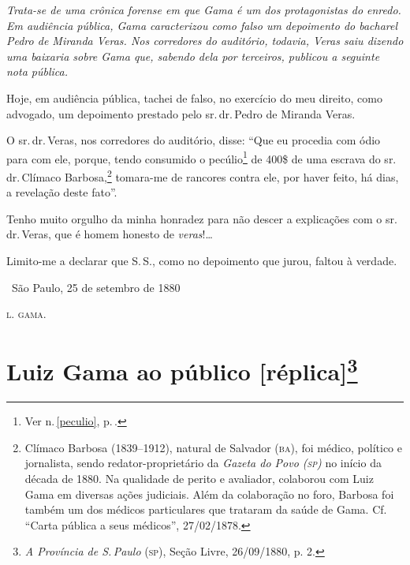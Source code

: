 
\begin{resumo}
\emph{Trata-se de uma crônica forense em que Gama é um dos protagonistas
do enredo. Em audiência pública, Gama caracterizou como falso um
depoimento do bacharel Pedro de Miranda Veras. Nos corredores do
auditório, todavia, Veras saiu dizendo uma baixaria sobre Gama que,
sabendo dela por terceiros, publicou a seguinte nota pública. }
\end{resumo}

Hoje, em audiência pública, tachei de falso, no exercício do meu
direito, como advogado, um depoimento prestado pelo sr.\,dr.\,Pedro de
Miranda Veras.

O sr.\,dr.\,Veras, nos corredores do auditório, disse: ``Que eu procedia
com ódio para com ele, porque, tendo consumido o pecúlio\footnote{
  Ver n.\,\ref{peculio}, p.\,\pageref{peculio}.} de 400\$ de uma escrava do sr.\,dr.\,Clímaco Barbosa,\footnote{Clímaco Barbosa (1839--1912), natural de \label{climaco}
  Salvador (\textsc{ba}), foi médico, político e jornalista, sendo
  redator-proprietário da \emph{Gazeta do Povo (\textsc{sp})} no início da década
  de 1880. Na qualidade de perito e avaliador, colaborou com Luiz Gama
  em diversas ações judiciais. Além da colaboração no foro, Barbosa foi
  também um dos médicos particulares que trataram da saúde de Gama. Cf.
  ``Carta pública a seus médicos'', 27/02/1878.}
tomara-me de rancores
contra ele, por haver feito, há dias, a revelação deste fato''.

Tenho muito orgulho da minha honradez para não descer a explicações com
o sr.\,dr.\,Veras, que é homem honesto de \emph{veras}!\ldots{}

Limito-me a declarar que S.\,S., como no depoimento que jurou, faltou à
verdade.\medskip

\hfill\ São Paulo, 25 de setembro de 1880

\hfill\textsc{l. gama.}

\section{Luiz Gama ao público {[}réplica{]}\protect\footnote{
\emph{\MakeUppercase{A P}rovíncia de \MakeUppercase{S.\,P}aulo} (\textsc{sp}), \MakeUppercase{S}eção \MakeUppercase{L}ivre, 26/09/1880, p. 2.}}

